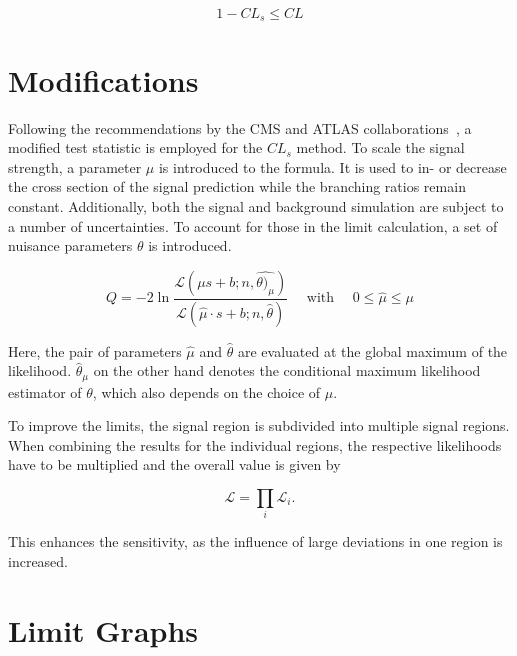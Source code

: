 \begin{equation}
  \label{eq:cl-excl}
  1 - CL_s \leq CL
\end{equation}

\section{Modifications}
\label{sec:mods}

Following the recommendations by the CMS and ATLAS collaborations~\cite{clsmod}, a modified test statistic is employed for the $CL_s$ method. To scale the signal strength, a parameter $\mu$ is introduced to the formula. It is used to in- or decrease the cross section of the signal prediction while the branching ratios remain constant. Additionally, both the signal and background simulation are subject to a number of uncertainties. To account for those in the limit calculation, a set of nuisance parameters $\theta$ is introduced.

\begin{equation}
  \label{eq:q-mod}
  Q = - 2 \ln{ \frac{\mathcal{L} (\mu s + b; n, \hat{\theta)_\mu}) }{\mathcal{L} (\hat{\mu} \cdot s + b; n, \hat{\theta} )} } \quad \text{ with } \quad 0 \leq \hat{\mu} \leq \mu
\end{equation}

\noindent Here, the pair of parameters $\hat{\mu}$ and $\hat{\theta}$ are evaluated at the global maximum of the likelihood. $\hat{\theta}_\mu$ on the other hand denotes the conditional maximum likelihood estimator of $\theta$, which also depends on the choice of $\mu$.


To improve the limits, the signal region is subdivided into multiple signal regions. When combining the results for the individual regions, the respective likelihoods have to be multiplied and the overall value is given by

\begin{equation}
  \label{eq:likelihood-product}
  \mathcal{L} = \prod_i \mathcal{L}_i.
\end{equation}

\noindent This enhances the sensitivity, as the influence of large deviations in one region is increased.

\section{Limit Graphs}
\label{sec:limit-graphs}

